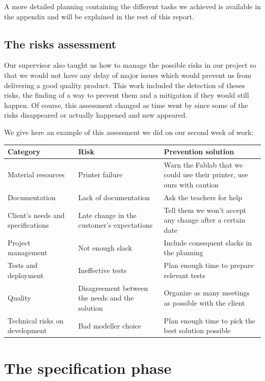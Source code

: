 \documentclass{report}
\begin{document}
A more detailed planning containing the different tasks we achieved is available in the appendix and will be explained in the rest of this report.

\section{The risks assessment}

Our supervisor also taught us how to manage the possible risks in our project so that we would not have any delay of major issues which would prevent us from delivering a good quality product. This work included the detection of theses risks, the finding of a way to prevent them and a mitigation if they would still happen. Of course, this assessment changed as time went by since some of the risks disappeared or actually happened and new appeared.

We give here an example of this assessment we did on our second week of work:

\begin{center}
	\begin{tabular}{|p{4cm}|p{5cm}|p{5cm}|}
		\hline
		Category & Risk & Prevention solution \\ \hline
		Material resources & Printer failure & Warn the Fablab that we could use their printer, use ours with caution \\
		Documentation & Lack of documentation & Ask the teachers for help \\
		Client's needs and specifications & Late change in the customer's expectations & Tell them we won't accept any change after a certain date \\
		Project management & Not enough slack & Include consequent slacks in the planning \\
		Tests and deployment & Ineffective tests & Plan enough time to prepare relevant tests \\
		Quality & Disagreement between the needs and the solution & Organize as many meetings as possible with the client \\
		Technical risks on development & Bad modeller choice & Plan enough time to pick the best solution possible \\
		\hline
	\end{tabular}
\end{center}

\chapter{The specification phase}
\end{document}
